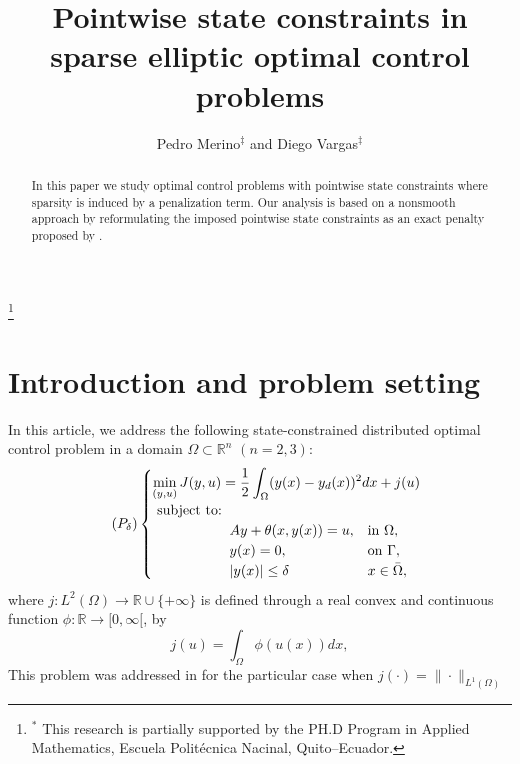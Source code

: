\documentclass[11pt,a4paper]{amsart}
\newcommand{\om}{\Omega}
\newcommand{\ga}{\Gamma}
\newcommand{\R}{\mathbb{R}}
\begin{document}
	\title[Nonconvex optimal control problems]{Pointwise state constraints in sparse elliptic optimal control problems}
	
	\author{Pedro Merino$^\ddag$ and Diego Vargas$^\ddag$}
	\address{$^\ddag$Research Center of Mathematical Modeling (MODEMAT) and Department of Mathematics, Escuela Polit\'ecnica Nacional, Quito, Ecuador}
	\keywords{}
	\thanks{$^*$ This research is partially supported by the PH.D Program in Applied Mathematics, Escuela Politécnica Nacinal,  Quito--Ecuador.}
	
	\smallskip
\begin{abstract}
In this paper we study optimal control problems with pointwise state constraints where sparsity is induced by a penalization term. Our analysis is based on a nonsmooth approach by reformulating the imposed pointwise state constraints as an exact penalty proposed by \cite{casas2009}. 
\end{abstract}
	
\maketitle 

\tableofcontents



\section{Introduction and problem setting}
In this article, we address the following state-constrained distributed optimal control problem in a domain $\om \subset \R^n$ $(n=2,3)$: 
\begin{equation}
		\tag{$P_{\delta}$} \label{eq:OCP}
		\begin{cases}
			\displaystyle\min_{(y,u)} J(y,u)=\frac12 \int_\om (y(x)-y_d(x))^2 dx + j(u)\\
			\hbox{ subject to: }\\
			\hspace{40pt}\begin{array}{rll}
				&Ay + \theta(x,y(x)) = u,  & \text{in } \om,\\
                &y(x) =0, & \text{on } \ga, \\
				&|y(x)|\le \delta&x\in \bar\om,
			\end{array}			
		\end{cases}
\end{equation}
where $j: L^2(\om) \to \R \cup \{+ \infty \}$ is defined through a real convex and continuous function $\phi:\mathbb{R}\to [0,\infty[$, by
\begin{equation}\label{eq:cost_function_j}
j(u)=\int_\om \phi(u(x)) dx,
\end{equation}
This problem was addressed in \cite{casas-trol} for the particular case when $j(\cdot)=\|\cdot\|_{L^1(\om)}$
\end{document}
